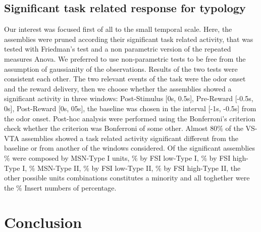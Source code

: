\subsection{Significant task related response for typology}
Our interest was focused first of all to the small temporal scale.
Here, the assemblies were pruned according their significant task related activity, that was tested with Friedman's test and a non parametric version of the repeated measures Anova. We preferred to use non-parametric tests to be free from the assumption of gaussianity of the observations. Results of the two tests were consistent each other. The two relevant events of the task were the odor onset and the reward delivery, then we choose whether the assemblies showed a significant activity in three windows: Post-Stimulus [0s, 0.5s], Pre-Reward [-0.5s, 0s], Post-Reward [0s, 05s], the baseline was chosen in the interval [-1s, -0.5s] from the odor onset. Post-hoc analysis were performed using the Bonferroni's criterion {\color{red}check whether the criterion was Bonferroni of some other}. Almost $80\%$ of the VS-VTA assemblies showed a task related activity significant different from the baseline or from another of the windows considered. Of the significant assemblies $\%$ were composed by MSN-Type I units, $\%$ by FSI low-Type I, $\%$ by FSI high-Type I, $\%$ MSN-Type II, $\%$ by FSI low-Type II, $\%$ by FSI high-Type II, the other possible units combinations constitutes a minority and all toghether were the $\%$ {\color{red} Insert numbers of percentage}.

\section{Conclusion}
